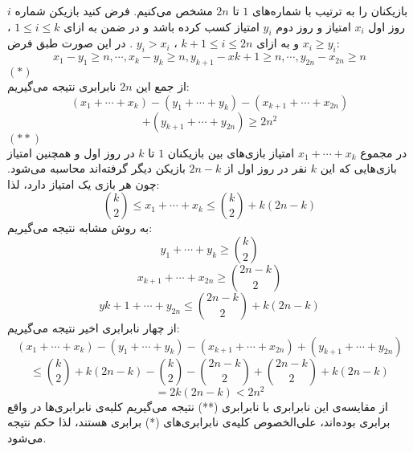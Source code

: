         \p
بازیکنان را به ترتیب با شماره‌های
$1$
تا
$2n$   
مشخص می‌کنیم. فرض کنید بازیکن شماره
$i$
روز اول
$x_i$
امتیاز و روز دوم
$y_i$
امتیاز کسب کرده باشد و در ضمن به ازای
$1 \leq i \leq k$
،
$x_i \geq y_i$
و به ازای
$k + 1 \leq i \leq 2n$
،
$y_i > x_i$
. در این صورت طبق فرض:
$$x_1 - y_1 \geq n, \cdots, x_k - y_k \geq n, y_{k+1} - x{k+1} \geq n, \cdots, y_{2n} - x_{2n} \geq n$$  
$(*)$
\\
از جمع این
$2n$
نابرابری نتیجه می‌گیریم:
$$(x_1 + \cdots + x_k) - (y_1 + \cdots + y_k) - (x_{k+1} + \cdots + x_{2n})$$
$$+(y_{k+1} + \cdots + y_{2n}) \geq 2n^2$$
$(**)$
\\
در مجموع
$x_1 + \cdots + x_k$
امتیاز بازی‌های بین بازیکنان
$1$
تا
$k$
در روز اول و همچنین امتیاز بازی‌هایی که این
$k$
نفر در روز اول از
$2n - k$
بازیکن دیگر گرفته‌اند محاسبه می‌شود. چون هر بازی یک امتیاز دارد، لذا:
$$\binom{k}{2} \leq x_1 + \cdots + x_k \leq \binom{k}{2} + k(2n - k)$$
به روش مشابه نتیجه می‌گیریم:
$$y_1 + \cdots +y_k \geq \binom{k}{2}$$
$$x_{k+1} + \cdots + x_{2n} \geq \binom{2n-k}{2}$$
$$y{k+1} + \cdots + y_{2n} \leq \binom{2n-k}{2} + k(2n - k)$$
از چهار نابرابری اخیر نتیجه می‌گیریم:
$$(x_1 + \cdots + x_k) - (y_1 + \cdots + y_k) - (x_{k+1} + \cdots + x_{2n}) + (y_{k+1} + \cdots + y_{2n})$$
$$\leq \binom{k}{2} + k(2n - k) - \binom{k}{2} - \binom{2n-k}{2} + \binom{2n-k}{2} + k(2n - k)$$
$$= 2k(2n - k) < 2n^2$$  
 از مقایسه‌ی این نابرابری با نابرابری (**) نتیجه می‌گیریم کلیه‌ی نابرابری‌ها در واقع برابری بوده‌اند، علی‌الخصوص کلیه‌ی نابرابری‌های (*) برابری هستند، لذا حکم نتیجه می‌شود.